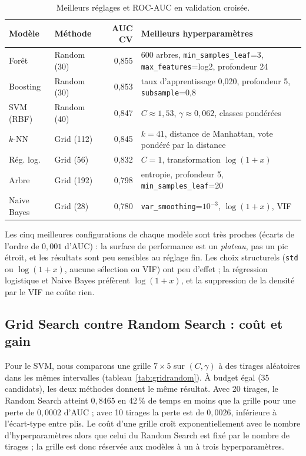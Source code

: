 \documentclass[11pt,a4paper]{article}
\begin{document}
\begin{table}[htbp]
\centering\small
\caption{Meilleurs réglages et ROC-AUC en validation croisée.}\label{tab:tuning}
\begin{tabular}{@{}llrp{6.3cm}@{}}
\toprule
Modèle & Méthode & AUC CV & Meilleurs hyperparamètres \\
\midrule
Forêt        & Random (30) & 0,855 & 600 arbres, \texttt{min\_samples\_leaf}=3, \texttt{max\_features}=log2, profondeur 24 \\
Boosting     & Random (30) & 0,853 & taux d'apprentissage 0,020, profondeur 5, \texttt{subsample}=0,8 \\
SVM (RBF)    & Random (40) & 0,847 & $C \approx 1{,}53$, $\gamma \approx 0{,}062$, classes pondérées \\
$k$-NN       & Grid (112)  & 0,845 & $k=41$, distance de Manhattan, vote pondéré par la distance \\
Rég. log.    & Grid (56)   & 0,832 & $C=1$, transformation $\log(1+x)$ \\
Arbre        & Grid (192)  & 0,798 & entropie, profondeur 5, \texttt{min\_samples\_leaf}=20 \\
Naive Bayes  & Grid (28)   & 0,780 & \texttt{var\_smoothing}=$10^{-3}$, $\log(1+x)$, VIF \\
\bottomrule
\end{tabular}
\end{table}

Les cinq meilleures configurations de chaque modèle sont très proches (écarts de l'ordre de $0{,}001$ d'AUC) : la surface de performance est un \emph{plateau}, pas un pic étroit,
et les résultats sont peu sensibles au réglage fin. Les choix structurels (\texttt{std} ou $\log(1+x)$, aucune sélection ou VIF) ont peu d'effet ; la régression logistique et Naive Bayes
préfèrent $\log(1+x)$, et la suppression de la densité par le VIF ne coûte rien.

\subsection{Grid Search contre Random Search : coût et gain}

Pour le SVM, nous comparons une grille $7 \times 5$ sur $(C, \gamma)$ à des tirages aléatoires dans les mêmes intervalles (tableau~\ref{tab:gridrandom}).
À budget égal (35 candidats), les deux méthodes donnent le même résultat. Avec 20 tirages, le Random Search atteint $0{,}8465$ en 42\,\% de temps en moins que la grille pour une perte de $0{,}0002$ d'AUC ;
avec 10 tirages la perte est de $0{,}0026$, inférieure à l'écart-type entre plis. Le coût d'une grille croît exponentiellement avec le nombre d'hyperparamètres alors que celui du Random Search est fixé par le nombre de tirages ;
la grille est donc réservée aux modèles à un à trois hyperparamètres.
\end{document}
